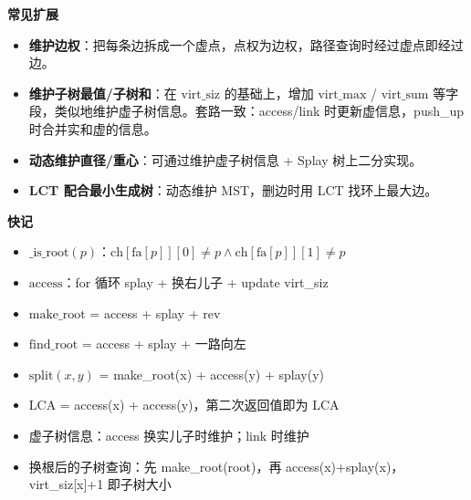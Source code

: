 \textbf{常见扩展}

\begin{itemize}
    \item \textbf{维护边权}：把每条边拆成一个虚点，点权为边权，路径查询时经过虚点即经过边。
    \item \textbf{维护子树最值/子树和}：在 $\text{virt\_siz}$ 的基础上，增加 $\text{virt\_max}$ / $\text{virt\_sum}$ 等字段，类似地维护虚子树信息。套路一致：access/link 时更新虚信息，push\_up 时合并实和虚的信息。
    \item \textbf{动态维护直径/重心}：可通过维护虚子树信息 + Splay 树上二分实现。
    \item \textbf{LCT 配合最小生成树}：动态维护 MST，删边时用 LCT 找环上最大边。
\end{itemize}

\textbf{快记}

\begin{itemize}
    \item $\text{\_is\_root}(p)$：$\text{ch}[\text{fa}[p]][0] \neq p \land \text{ch}[\text{fa}[p]][1] \neq p$
    \item $\text{access}$：for 循环 splay + 换右儿子 + update virt\_siz
    \item $\text{make\_root}$ = access + splay + rev
    \item $\text{find\_root}$ = access + splay + 一路向左
    \item $\text{split}(x, y)$ = make\_root(x) + access(y) + splay(y)
    \item $\text{LCA}$ = access(x) + access(y)，第二次返回值即为 LCA
    \item 虚子树信息：access 换实儿子时维护；link 时维护
    \item 换根后的子树查询：先 make\_root(root)，再 access(x)+splay(x)，virt\_siz[x]+1 即子树大小
\end{itemize}
